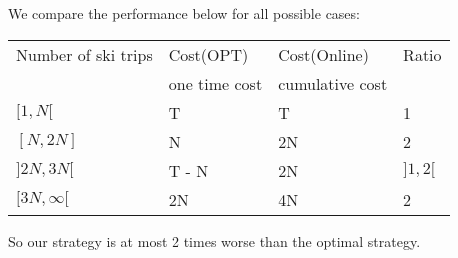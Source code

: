 \noindent
We compare the performance below for all possible cases:

\begin{center}
\begin{tabular}{|l|l|l|l|}
  \hline
  Number of ski trips & Cost(OPT)     & Cost(Online)    & Ratio \\
                      & one time cost & cumulative cost & \\
  \hline
  $[1, N[$            & T             & T               & 1 \\
  \hline
  $[N, 2N]$           & N             & 2N              & 2 \\
  \hline
  $]2N, 3N[$          & T - N         & 2N              & $]1, 2[$ \\
  \hline
  $[3N, \infty[$      & 2N            & 4N              & 2 \\
  \hline
\end{tabular}
\end{center}

\noindent
So our strategy is at most 2 times worse than the optimal strategy.
